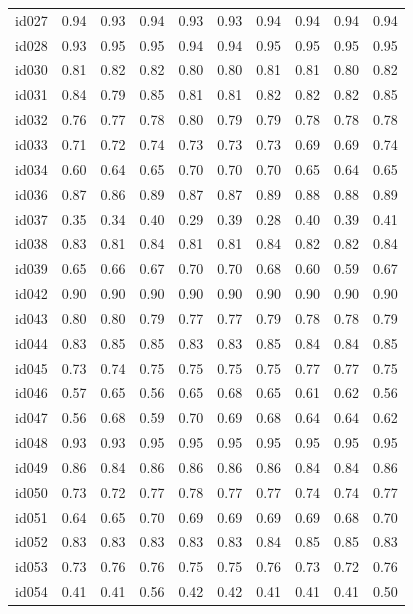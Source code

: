 \begin{tabular}{lrrrrrrrrr}
id027 & 0.94 & 0.93 & 0.94 & 0.93 & 0.93 & 0.94 & 0.94 & 0.94 & 0.94 \\
id028 & 0.93 & 0.95 & 0.95 & 0.94 & 0.94 & 0.95 & 0.95 & 0.95 & 0.95 \\
id030 & 0.81 & 0.82 & 0.82 & 0.80 & 0.80 & 0.81 & 0.81 & 0.80 & 0.82 \\
id031 & 0.84 & 0.79 & 0.85 & 0.81 & 0.81 & 0.82 & 0.82 & 0.82 & 0.85 \\
id032 & 0.76 & 0.77 & 0.78 & 0.80 & 0.79 & 0.79 & 0.78 & 0.78 & 0.78 \\
id033 & 0.71 & 0.72 & 0.74 & 0.73 & 0.73 & 0.73 & 0.69 & 0.69 & 0.74 \\
id034 & 0.60 & 0.64 & 0.65 & 0.70 & 0.70 & 0.70 & 0.65 & 0.64 & 0.65 \\
id036 & 0.87 & 0.86 & 0.89 & 0.87 & 0.87 & 0.89 & 0.88 & 0.88 & 0.89 \\
id037 & 0.35 & 0.34 & 0.40 & 0.29 & 0.39 & 0.28 & 0.40 & 0.39 & 0.41 \\
id038 & 0.83 & 0.81 & 0.84 & 0.81 & 0.81 & 0.84 & 0.82 & 0.82 & 0.84 \\
id039 & 0.65 & 0.66 & 0.67 & 0.70 & 0.70 & 0.68 & 0.60 & 0.59 & 0.67 \\
id042 & 0.90 & 0.90 & 0.90 & 0.90 & 0.90 & 0.90 & 0.90 & 0.90 & 0.90 \\
id043 & 0.80 & 0.80 & 0.79 & 0.77 & 0.77 & 0.79 & 0.78 & 0.78 & 0.79 \\
id044 & 0.83 & 0.85 & 0.85 & 0.83 & 0.83 & 0.85 & 0.84 & 0.84 & 0.85 \\
id045 & 0.73 & 0.74 & 0.75 & 0.75 & 0.75 & 0.75 & 0.77 & 0.77 & 0.75 \\
id046 & 0.57 & 0.65 & 0.56 & 0.65 & 0.68 & 0.65 & 0.61 & 0.62 & 0.56 \\
id047 & 0.56 & 0.68 & 0.59 & 0.70 & 0.69 & 0.68 & 0.64 & 0.64 & 0.62 \\
id048 & 0.93 & 0.93 & 0.95 & 0.95 & 0.95 & 0.95 & 0.95 & 0.95 & 0.95 \\
id049 & 0.86 & 0.84 & 0.86 & 0.86 & 0.86 & 0.86 & 0.84 & 0.84 & 0.86 \\
id050 & 0.73 & 0.72 & 0.77 & 0.78 & 0.77 & 0.77 & 0.74 & 0.74 & 0.77 \\
id051 & 0.64 & 0.65 & 0.70 & 0.69 & 0.69 & 0.69 & 0.69 & 0.68 & 0.70 \\
id052 & 0.83 & 0.83 & 0.83 & 0.83 & 0.83 & 0.84 & 0.85 & 0.85 & 0.83 \\
id053 & 0.73 & 0.76 & 0.76 & 0.75 & 0.75 & 0.76 & 0.73 & 0.72 & 0.76 \\
id054 & 0.41 & 0.41 & 0.56 & 0.42 & 0.42 & 0.41 & 0.41 & 0.41 & 0.50 \\

\end{tabular}
